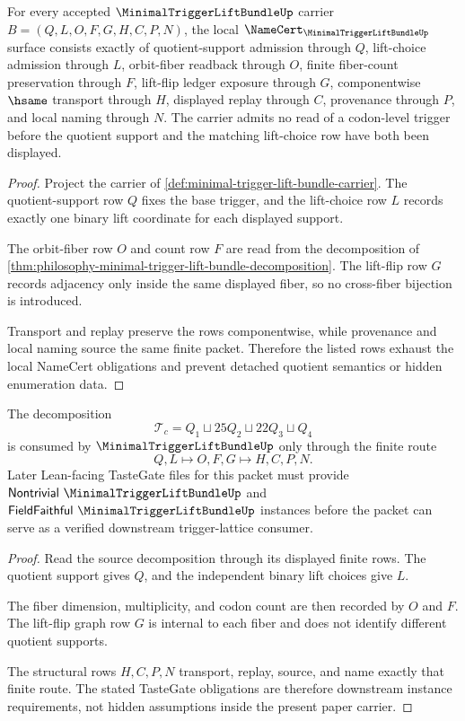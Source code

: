 \begin{theorem}
\label{thm:minimal-trigger-lift-bundle-namecert-obligations}
For every accepted $\MinimalTriggerLiftBundleUp$ carrier $B=(Q,L,O,F,G,H,C,P,N)$, the local $\NameCert_{\MinimalTriggerLiftBundleUp}$ surface consists exactly of quotient-support admission through $Q$, lift-choice admission through $L$, orbit-fiber readback through $O$, finite fiber-count preservation through $F$, lift-flip ledger exposure through $G$, componentwise $\hsame$ transport through $H$, displayed replay through $C$, provenance through $P$, and local naming through $N$. The carrier admits no read of a codon-level trigger before the quotient support and the matching lift-choice row have both been displayed.
\end{theorem}
\begin{proof}
Project the carrier of \autoref{def:minimal-trigger-lift-bundle-carrier}. The quotient-support row $Q$ fixes the base trigger, and the lift-choice row $L$ records exactly one binary lift coordinate for each displayed support.

The orbit-fiber row $O$ and count row $F$ are read from the decomposition of \autoref{thm:philosophy-minimal-trigger-lift-bundle-decomposition}. The lift-flip row $G$ records adjacency only inside the same displayed fiber, so no cross-fiber bijection is introduced.

Transport and replay preserve the rows componentwise, while provenance and local naming source the same finite packet. Therefore the listed rows exhaust the local NameCert obligations and prevent detached quotient semantics or hidden enumeration data.
\end{proof}

\begin{theorem}
\label{thm:minimal-trigger-lift-bundle-vision-handoff}
The decomposition
$$
\mathcal{T}_{c}=Q_{1}\sqcup25Q_{2}\sqcup22Q_{3}\sqcup Q_{4}
$$
is consumed by $\MinimalTriggerLiftBundleUp$ only through the finite route
$$
Q,L \longmapsto O,F,G \longmapsto H,C,P,N .
$$
Later Lean-facing TasteGate files for this packet must provide $\mathsf{Nontrivial}\ \MinimalTriggerLiftBundleUp$ and $\mathsf{FieldFaithful}\ \MinimalTriggerLiftBundleUp$ instances before the packet can serve as a verified downstream trigger-lattice consumer.
\end{theorem}
\begin{proof}
Read the source decomposition through its displayed finite rows. The quotient support gives $Q$, and the independent binary lift choices give $L$.

The fiber dimension, multiplicity, and codon count are then recorded by $O$ and $F$. The lift-flip graph row $G$ is internal to each fiber and does not identify different quotient supports.

The structural rows $H,C,P,N$ transport, replay, source, and name exactly that finite route. The stated TasteGate obligations are therefore downstream instance requirements, not hidden assumptions inside the present paper carrier.
\end{proof}

